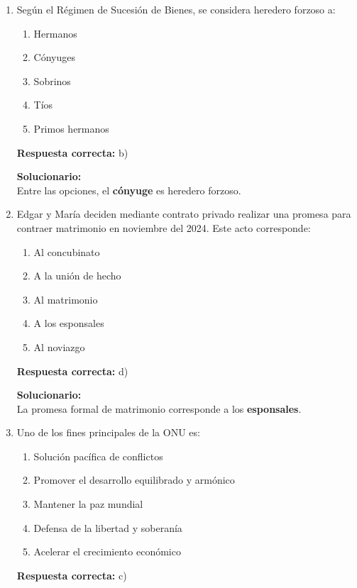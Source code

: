 \begin{enumerate}

	
	\item Según el Régimen de Sucesión de Bienes, se considera heredero forzoso a:
	\begin{enumerate}[label=\alph*)]
		\item Hermanos
		\item Cónyuges
		\item Sobrinos
		\item Tíos
		\item Primos hermanos
	\end{enumerate}
	\textbf{Respuesta correcta:} b)
	
	\vspace{2mm}
	\textbf{Solucionario:}\\
	Entre las opciones, el \textbf{cónyuge} es heredero forzoso.
	
	\vspace{6mm}
	
	\item Edgar y María deciden mediante contrato privado realizar una promesa para contraer matrimonio en noviembre del 2024. Este acto corresponde:
	\begin{enumerate}[label=\alph*)]
		\item Al concubinato
		\item A la unión de hecho
		\item Al matrimonio
		\item A los esponsales
		\item Al noviazgo
	\end{enumerate}
	\textbf{Respuesta correcta:} d)
	
	\vspace{2mm}
	\textbf{Solucionario:}\\
	La promesa formal de matrimonio corresponde a los \textbf{esponsales}.
	
	\vspace{6mm}
	
	\item Uno de los fines principales de la ONU es:
	\begin{enumerate}[label=\alph*)]
		\item Solución pacífica de conflictos
		\item Promover el desarrollo equilibrado y armónico
		\item Mantener la paz mundial
		\item Defensa de la libertad y soberanía
		\item Acelerar el crecimiento económico
	\end{enumerate}
	\textbf{Respuesta correcta:} c)
	

\end{enumerate}
